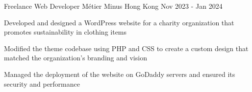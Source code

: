 
\begin{cventries}

  \cventry
  {Freelance Web Developer}
  {Métier Minus}
  {Hong Kong}
  {Nov 2023 - Jan 2024}
  {
    \begin{cvitems}
      \item {Developed and designed a WordPress website for a charity organization that promotes sustainability in clothing items}
      \item {Modified the theme codebase using PHP and CSS to create a custom design that matched the organization’s branding and vision}
      \item {Managed the deployment of the website on GoDaddy servers and ensured its security and performance}
    \end{cvitems}
  }


\end{cventries}
